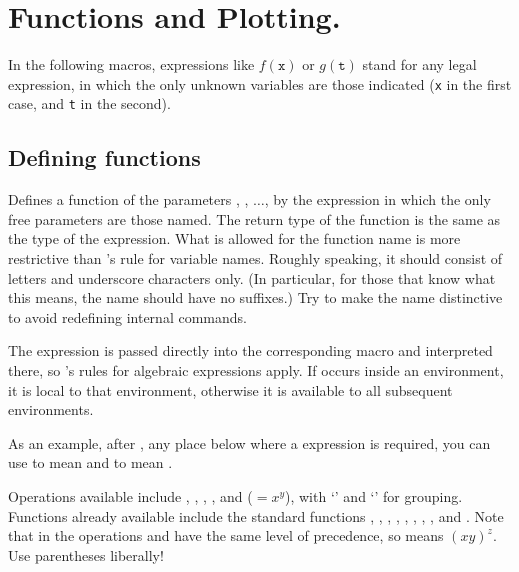 \documentclass[letterpaper]{article}
\begin{document}
\section{Functions and Plotting.}\label{functions}

In the following macros, expressions like $f(\mathtt{x})$ or $g(\mathtt{t})$
stand for any legal \MF{} expression, in which the only unknown
variables are those indicated (\texttt{x} in the first case, and \texttt{t} in
the second).

\subsection{Defining functions}\label{defining}

\begin{cd}
%
\end{cd}

Defines a \MF{} function  of the parameters ,
, $\ldots$, by the \MF{} expression  in which
the only free parameters are those named.  The return type of the
function is the same as the type of the expression. What is allowed for
the function name  is more restrictive than \MF{}'s rule for
variable names. Roughly speaking, it should consist of letters and
underscore characters only. (In particular, for those that know what
this means, the name should have no suffixes.) Try to make the name
distinctive to avoid redefining internal \MF{} commands.

The expression  is passed directly into the corresponding
\MF{} macro and interpreted there, so \MF{}'s rules for algebraic
expressions apply. If  occurs inside an 
environment, it is local to that environment, otherwise it is available
to all subsequent  environments.

As an example, after , any
place below where a \MF{} expression is required, you can use
 to mean  and  to mean
.

Operations available include \mfc{+}, \mfc{-}, \mfc{*}, \mfc{/}, and
\mfc{**} ($=x^y$), with `\mfc{(}' and `\mfc{)}' for grouping.
Functions already available include the standard \MF{} functions
, , , , ,
, , , and . Note that in \MF{}
the operations \mfc{*} and \mfc{**} have the same level of precedence,
so  means $(xy)^z$. Use parentheses liberally!
\end{document}
